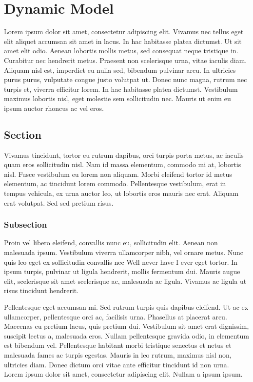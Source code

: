 \chapter{Dynamic Model}
\label{chapter2}

Lorem ipsum dolor sit amet, consectetur adipiscing elit. Vivamus nec tellus eget elit aliquet accumsan sit amet in lacus. In hac habitasse platea dictumst. Ut sit amet elit odio. Aenean lobortis mollis metus, sed consequat neque tristique in. Curabitur nec hendrerit metus. Praesent non scelerisque urna, vitae iaculis diam. Aliquam nisl est, imperdiet eu nulla sed, bibendum pulvinar arcu. In ultricies purus purus, vulputate congue justo volutpat ut. Donec nunc magna, rutrum nec turpis et, viverra efficitur lorem. In hac habitasse platea dictumst. Vestibulum maximus lobortis nisl, eget molestie sem sollicitudin nec. Mauris ut enim eu ipsum auctor rhoncus ac vel eros.

\section{Section}
Vivamus tincidunt, tortor eu rutrum dapibus, orci turpis porta metus, ac iaculis quam eros sollicitudin nisl. Nam id massa elementum, commodo mi at, lobortis nisl. Fusce vestibulum eu lorem non aliquam. Morbi eleifend tortor id metus elementum, ac tincidunt lorem commodo. Pellentesque vestibulum, erat in tempus vehicula, ex urna auctor leo, ut lobortis eros mauris nec erat. Aliquam erat volutpat. Sed sed pretium risus.

\subsection{Subsection}
Proin vel libero eleifend, convallis nunc eu, sollicitudin elit. Aenean non malesuada ipsum. Vestibulum viverra ullamcorper nibh, vel ornare metus. Nunc quis leo eget ex sollicitudin convallis nec Well never have I ever \cite{Latexslow} eget tortor. In ipsum turpis, pulvinar ut ligula hendrerit, mollis fermentum dui. Mauris augue elit, scelerisque sit amet scelerisque ac, malesuada ac ligula. Vivamus ac ligula ut risus tincidunt hendrerit.

Pellentesque eget accumsan mi. Sed rutrum turpis quis dapibus eleifend. Ut ac ex ullamcorper, pellentesque orci ac, facilisis urna. Phasellus at placerat arcu. Maecenas eu pretium lacus, quis pretium dui. Vestibulum sit amet erat dignissim, suscipit lectus a, malesuada eros. Nullam pellentesque gravida odio, in elementum est bibendum vel. Pellentesque habitant morbi tristique senectus et netus et malesuada fames ac turpis egestas. Mauris in leo rutrum, maximus nisl non, ultricies diam. Donec dictum orci vitae ante efficitur tincidunt id non urna. Lorem ipsum dolor sit amet, consectetur adipiscing elit. Nullam a ipsum ipsum.